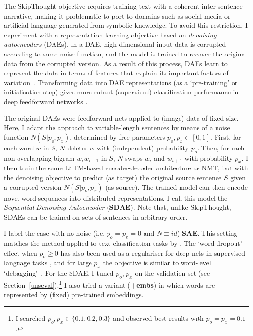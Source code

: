 \vspace{5pt} The SkipThought objective requires training text with a coherent inter-sentence narrative, making it problematic to port to domains such as social media or artificial language generated from symbolic knowledge. To avoid this restriction, I experiment with a representation-learning objective based on \emph{denoising autoencoders} (DAEs). In a DAE, high-dimensional input data is corrupted according to some noise function, and the model is trained to recover the original data from the corrupted version. As a result of this process, DAEs learn to represent the data in terms of features that explain its important factors of variation~\citep{vincent2008extracting}. Transforming data into DAE representations (as a `pre-training' or initialisation step) gives more robust (supervised) classification performance in deep feedforward networks \citep{vincent2010stacked}.

The original DAEs were feedforward nets applied to (image) data of fixed size. Here, I adapt the approach to variable-length sentences by means of a noise function \(N(S | p_o,p_x)\), determined by free parameters \(p_o,p_x \in [0,1]\). First, for each word \(w\) in \(S\), \(N\) deletes \(w\) with (independent) probability \(p_o\). Then, for each non-overlapping bigram \(w_i w_{i+1}\) in \(S\), \(N\) swaps \(w_i\) and \(w_{i+1}\) with probability \(p_x\). I then train the same LSTM-based encoder-decoder architecture as NMT, but with the denoising objective to predict (as target) the original source sentence \(S\) given a corrupted version \(N(S |p_o,p_x)\) (as source). The trained model can then encode novel word sequences into distributed representations. I call this model the \emph{Sequential Denoising Autoencoder} ({\bf SDAE}). Note that, unlike SkipThought, SDAEs can be trained on sets of sentences in arbitrary order.   

I label the case with no noise (i.e. \(p_o = p_x = 0\) and \(N \equiv id\)) {\bf SAE}. This setting matches the method applied to text classification tasks by \cite{dai2015semi}. The `word dropout' effect when \(p_o \geq 0\) has also been used as a regulariser for deep nets in supervised language tasks \citep{iyyer2015deep}, and for large \(p_x\) the objective is similar to word-level `debagging'~\citep{sutskever2011generating}. For the SDAE, I tuned \(p_o\), \(p_x\) on the validation set (see Section~\ref{unseval}).\footnote{I searched \(p_o,p_x \in \{0.1,0.2,0.3\}\) and observed best results with \(p_o = p_x = 0.1\).} I also tried a variant ({\bf +embs}) in which words are represented by (fixed) pre-trained embeddings. 

